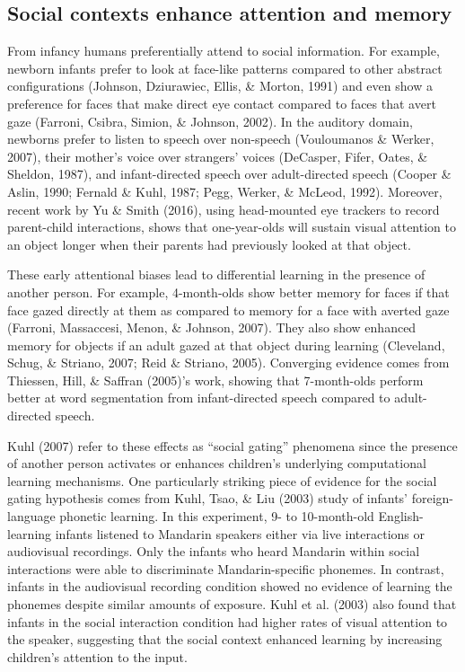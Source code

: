 \documentclass[oneside]{report}
\begin{document}
\hypertarget{social-contexts-enhance-attention-and-memory}{%
\subsection{Social contexts enhance attention and
memory}\label{social-contexts-enhance-attention-and-memory}}

From infancy humans preferentially attend to social information. For
example, newborn infants prefer to look at face-like patterns compared
to other abstract configurations (Johnson, Dziurawiec, Ellis, \& Morton,
1991) and even show a preference for faces that make direct eye contact
compared to faces that avert gaze (Farroni, Csibra, Simion, \& Johnson,
2002). In the auditory domain, newborns prefer to listen to speech over
non-speech (Vouloumanos \& Werker, 2007), their mother's voice over
strangers' voices (DeCasper, Fifer, Oates, \& Sheldon, 1987), and
infant-directed speech over adult-directed speech (Cooper \& Aslin,
1990; Fernald \& Kuhl, 1987; Pegg, Werker, \& McLeod, 1992). Moreover,
recent work by Yu \& Smith (2016), using head-mounted eye trackers to
record parent-child interactions, shows that one-year-olds will sustain
visual attention to an object longer when their parents had previously
looked at that object.

These early attentional biases lead to differential learning in the
presence of another person. For example, 4-month-olds show better memory
for faces if that face gazed directly at them as compared to memory for
a face with averted gaze (Farroni, Massaccesi, Menon, \& Johnson, 2007).
They also show enhanced memory for objects if an adult gazed at that
object during learning (Cleveland, Schug, \& Striano, 2007; Reid \&
Striano, 2005). Converging evidence comes from Thiessen, Hill, \&
Saffran (2005)'s work, showing that 7-month-olds perform better at word
segmentation from infant-directed speech compared to adult-directed
speech.

Kuhl (2007) refer to these effects as ``social gating'' phenomena since
the presence of another person activates or enhances children's
underlying computational learning mechanisms. One particularly striking
piece of evidence for the social gating hypothesis comes from Kuhl,
Tsao, \& Liu (2003) study of infants' foreign-language phonetic
learning. In this experiment, 9- to 10-month-old English-learning
infants listened to Mandarin speakers either via live interactions or
audiovisual recordings. Only the infants who heard Mandarin within
social interactions were able to discriminate Mandarin-specific
phonemes. In contrast, infants in the audiovisual recording condition
showed no evidence of learning the phonemes despite similar amounts of
exposure. Kuhl et al. (2003) also found that infants in the social
interaction condition had higher rates of visual attention to the
speaker, suggesting that the social context enhanced learning by
increasing children's attention to the input.
\end{document}

